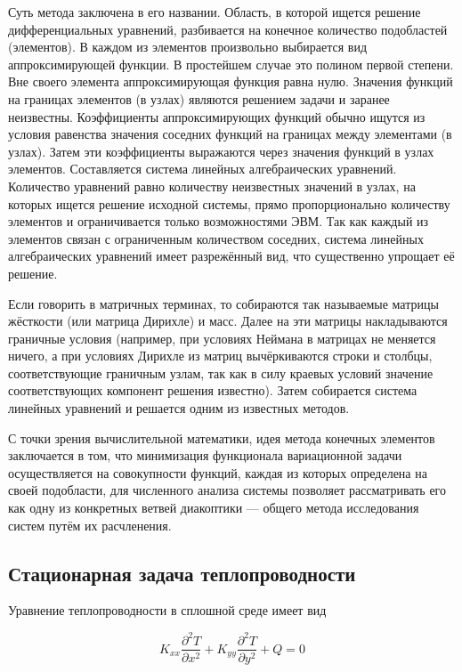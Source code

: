 \documentclass[a4paper, 14pt]{extarticle}
\begin{document}
Суть метода заключена в его названии. Область, в которой ищется решение
дифференциальных уравнений, разбивается на конечное количество подобластей
(элементов). В каждом из элементов произвольно выбирается вид аппроксимирующей
функции. В простейшем случае это полином первой степени. Вне своего элемента
аппроксимирующая функция равна нулю. Значения функций на границах элементов (в
узлах) являются решением задачи и заранее неизвестны. Коэффициенты
аппроксимирующих функций обычно ищутся из условия равенства значения соседних
функций на границах между элементами (в узлах). Затем эти коэффициенты
выражаются через значения функций в узлах элементов. Составляется система
линейных алгебраических уравнений. Количество уравнений равно количеству
неизвестных значений в узлах, на которых ищется решение исходной системы, прямо
пропорционально количеству элементов и ограничивается только возможностями ЭВМ.
Так как каждый из элементов связан с ограниченным количеством соседних, система
линейных алгебраических уравнений имеет разрежённый вид, что существенно
упрощает её решение.

Если говорить в матричных терминах, то собираются так называемые матрицы
жёсткости (или матрица Дирихле) и масс. Далее на эти матрицы накладываются
граничные условия (например, при условиях Неймана в матрицах не меняется ничего,
а при условиях Дирихле из матриц вычёркиваются строки и столбцы, соответствующие
граничным узлам, так как в силу краевых условий значение соответствующих
компонент решения известно). Затем собирается система линейных уравнений и
решается одним из известных методов.

С точки зрения вычислительной математики, идея метода конечных элементов
заключается в том, что минимизация функционала вариационной задачи
осуществляется на совокупности функций, каждая из которых определена на своей
подобласти, для численного анализа системы позволяет рассматривать его как одну
из конкретных ветвей диакоптики — общего метода исследования систем путём их
расчленения.

\subsection{Стационарная задача теплопроводности}

Уравнение теплопроводности в сплошной среде имеет вид

\begin{equation}
	K_{xx} \frac{\partial^2 T}{\partial x^2} +
	K_{yy} \frac{\partial^2 T}{\partial y^2} +
	Q = 0
\end{equation} \label{eq:heat}
\end{document}
